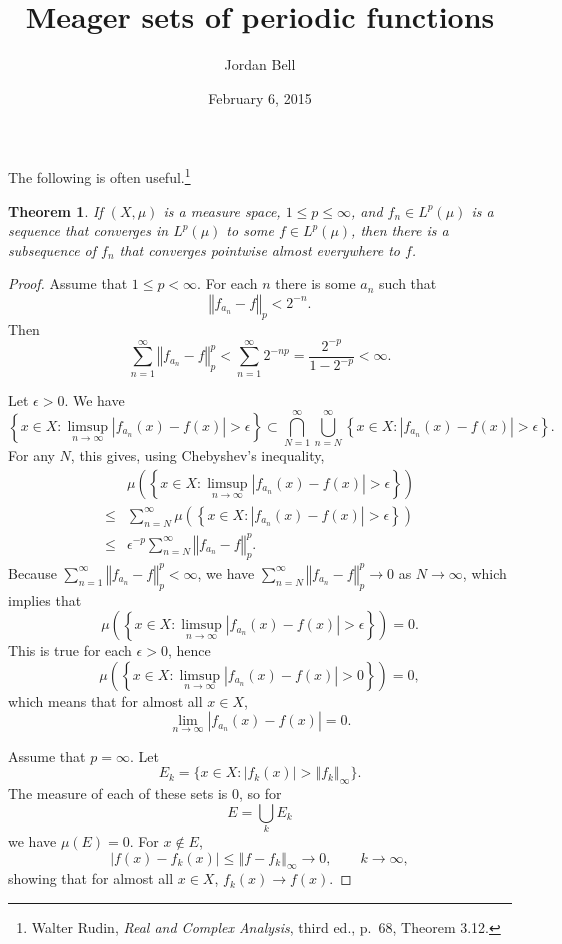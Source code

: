 \documentclass{article}
\newcommand{\norm}[1]{\left\Vert #1 \right\Vert}
\newtheorem{theorem}{Theorem}
\theoremstyle{definition}
\begin{document}
\title{Meager sets of periodic functions}
\author{Jordan Bell}
\date{February 6, 2015}

\maketitle

The following is often useful.\footnote{Walter Rudin, {\em Real and Complex Analysis}, third ed.,
p.~68, Theorem 3.12.}

\begin{theorem}
If $(X,\mu)$ is a measure space, $1 \leq p \leq \infty$, and $f_n \in L^p(\mu)$ is a sequence
that converges in $L^p(\mu)$ to some $f \in L^p(\mu)$, then there is a subsequence
of $f_n$ that converges pointwise almost everywhere to $f$.
\end{theorem}
\begin{proof}
Assume that $1 \leq p < \infty$. For each $n$ there is some $a_n$ such that
\[
\norm{f_{a_n}-f}_p < 2^{-n}.
\]
Then
\[
\sum_{n=1}^\infty \norm{f_{a_n}-f}_p^p  < \sum_{n=1}^\infty 2^{-np}
= \frac{2^{-p}}{1-2^{-p}}<\infty.
\]

Let $\epsilon>0$. We have
\[
\left\{x \in X: \limsup_{n \to \infty} |f_{a_n}(x)-f(x)|>\epsilon\right\}
\subset \bigcap_{N=1}^\infty \bigcup_{n = N}^\infty \left\{x \in X: |f_{a_n}(x)-f(x)|>\epsilon\right\}.
\]
For any $N$, this gives, using Chebyshev's inequality, 
\[
\begin{split}
&\mu\left(\left\{x \in X: \limsup_{n \to \infty} |f_{a_n}(x)-f(x)|>\epsilon\right\}\right)\\
\leq&
\sum_{n=N}^\infty \mu\left( \left\{x \in X: |f_{a_n}(x)-f(x)|>\epsilon\right\}\right)\\
\leq& \epsilon^{-p}  \sum_{n=N}^\infty\norm{f_{a_n}-f}_p^p.
\end{split}
\]
Because $\sum_{n=1}^\infty \norm{f_{a_n}-f}_p^p<\infty$,  we have
$\sum_{n=N}^\infty\norm{f_{a_n}-f}_p^p \to 0$ as $N \to \infty$, which implies that
\[
\mu\left(\left\{x \in X: \limsup_{n \to \infty} |f_{a_n}(x)-f(x)|>\epsilon\right\}\right)
=0.
\]
This is true for each $\epsilon>0$, hence
\[
\mu\left(\left\{x \in X: \limsup_{n \to \infty} |f_{a_n}(x)-f(x)|>0\right\}\right)=0,
\]
which means that for almost all $x \in X$,
\[
\lim_{n \to \infty} |f_{a_n}(x)-f(x)| =0.
\]

Assume that $p=\infty$. Let
\[
E_k = \{x \in X: |f_k(x)|>\norm{f_k}_\infty\}.
\]
The measure of each of these sets is $0$, so for
\[
E = \bigcup_k E_k
\]
we have $\mu(E)=0$.
For $x \not \in E$,
\[
|f(x)-f_k(x)| \leq \norm{f-f_k}_\infty \to 0, \qquad k \to \infty,
\]
showing that for almost all $x \in X$, $f_k(x) \to f(x)$.
\end{proof}
\end{document}
